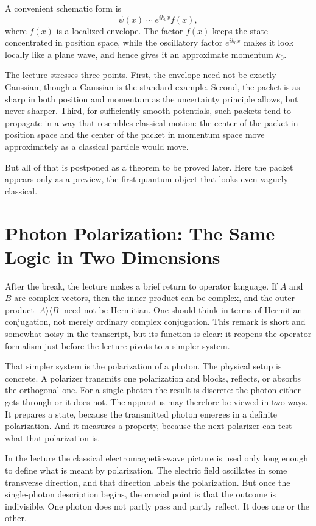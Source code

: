 A convenient schematic form is
\begin{equation}
\psi(x)\sim e^{ik_0x}f(x),
\end{equation}
where \(f(x)\) is a localized envelope. The factor \(f(x)\) keeps the state concentrated in position space, while the oscillatory factor \(e^{ik_0x}\) makes it look locally like a plane wave, and hence gives it an approximate momentum \(k_0\).

The lecture stresses three points. First, the envelope need not be exactly Gaussian, though a Gaussian is the standard example. Second, the packet is as sharp in both position and momentum as the uncertainty principle allows, but never sharper. Third, for sufficiently smooth potentials, such packets tend to propagate in a way that resembles classical motion: the center of the packet in position space and the center of the packet in momentum space move approximately as a classical particle would move.

But all of that is postponed as a theorem to be proved later. Here the packet appears only as a preview, the first quantum object that looks even vaguely classical.

\section{Photon Polarization: The Same Logic in Two Dimensions}

After the break, the lecture makes a brief return to operator language. If \(A\) and \(B\) are complex vectors, then the inner product can be complex, and the outer product \(|A\rangle\langle B|\) need not be Hermitian. One should think in terms of Hermitian conjugation, not merely ordinary complex conjugation. This remark is short and somewhat noisy in the transcript, but its function is clear: it reopens the operator formalism just before the lecture pivots to a simpler system.

That simpler system is the polarization of a photon. The physical setup is concrete. A polarizer transmits one polarization and blocks, reflects, or absorbs the orthogonal one. For a single photon the result is discrete: the photon either gets through or it does not. The apparatus may therefore be viewed in two ways. It prepares a state, because the transmitted photon emerges in a definite polarization. And it measures a property, because the next polarizer can test what that polarization is.

In the lecture the classical electromagnetic-wave picture is used only long enough to define what is meant by polarization. The electric field oscillates in some transverse direction, and that direction labels the polarization. But once the single-photon description begins, the crucial point is that the outcome is indivisible. One photon does not partly pass and partly reflect. It does one or the other.

